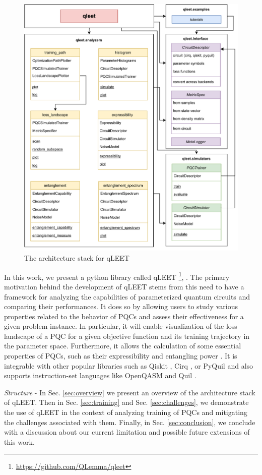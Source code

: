 \documentclass[%
 reprint,
 amsmath,
 amssymb,
 showkeys,
 pra,
 floatfix,
]{revtex4-2}
\begin{document}
\begin{figure}[!th]
    \centering
    \includegraphics[width=0.61\linewidth]{images/qleet-architecture.pdf}
    \caption{The architecture stack for qLEET}
    \label{fig:qleet-architecture}
\end{figure}

In this work, we present a python library called qLEET \footnote{\href{https://github.com/QLemma/qleet}{https://github.com/QLemma/qleet}}, \cite{qleet-zenodo}. The primary motivation behind the development of qLEET stems from this need to have a framework for analyzing the capabilities of parameterized quantum circuits and comparing their performances. It does so by allowing users to study various properties related to the behavior of PQCs and assess their effectiveness for a given problem instance. In particular, it will enable visualization of the loss landscape of a PQC for a given objective function and its training trajectory in the parameter space. Furthermore, it allows the calculation of some essential properties of PQCs, such as their expressibility and entangling power \cite{10.1002/qute.201900070}. It is integrable with other popular libraries such as Qiskit \cite{comp_qiskit}, Cirq \cite{comp_cirq}, or PyQuil \cite{ccquad_Pyquil} and also supports instruction-set languages like OpenQASM \cite{2021arXiv210414722C} and Quil \cite{ccquad_Pyquil}.

\textit{Structure} - In Sec. \ref{sec:overview} we present an overview of the architecture stack of qLEET. Then in Sec. \ref{sec:training} and Sec. \ref{sec:challenges}, we demonstrate the use of qLEET in the context of analyzing training of PQCs and mitigating the challenges associated with them. Finally, in Sec. \ref{sec:conclusion}, we conclude with a discussion about our current limitation and possible future extensions of this work.
\end{document}

